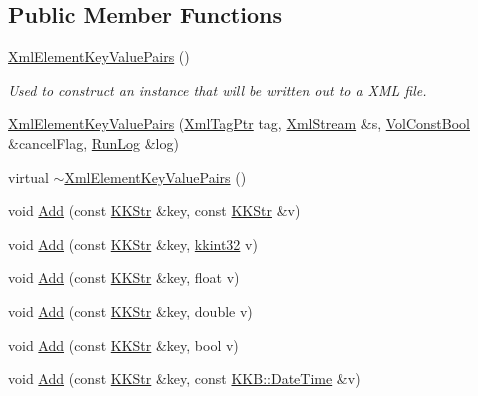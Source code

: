 \subsection*{Public Member Functions}
\begin{DoxyCompactItemize}
\item 
\hyperlink{class_k_k_b_1_1_xml_element_key_value_pairs_ad07cc9e4db6a0a62e69e9a08d21874fa}{Xml\+Element\+Key\+Value\+Pairs} ()
\begin{DoxyCompactList}\small\item\em Used to construct an instance that will be written out to a X\+ML file.\end{DoxyCompactList}\item 
\hyperlink{class_k_k_b_1_1_xml_element_key_value_pairs_a791817932e4f210de4c1f1d76926e4cb}{Xml\+Element\+Key\+Value\+Pairs} (\hyperlink{namespace_k_k_b_a9253a3ea8a5da18ca82be4ca2b390ef0}{Xml\+Tag\+Ptr} tag, \hyperlink{class_k_k_b_1_1_xml_stream}{Xml\+Stream} \&s, \hyperlink{namespace_k_k_b_a7d390f568e2831fb76b86b56c87bf92f}{Vol\+Const\+Bool} \&cancel\+Flag, \hyperlink{class_k_k_b_1_1_run_log}{Run\+Log} \&log)
\item 
virtual \hyperlink{class_k_k_b_1_1_xml_element_key_value_pairs_a9aef5c5df7adca778dc63279cbe9405d}{$\sim$\+Xml\+Element\+Key\+Value\+Pairs} ()
\item 
void \hyperlink{class_k_k_b_1_1_xml_element_key_value_pairs_a183f57a4bf399567339851b93fa127c9}{Add} (const \hyperlink{class_k_k_b_1_1_k_k_str}{K\+K\+Str} \&key, const \hyperlink{class_k_k_b_1_1_k_k_str}{K\+K\+Str} \&v)
\item 
void \hyperlink{class_k_k_b_1_1_xml_element_key_value_pairs_afa83abc034f5078ee2e0e7e0b0731c52}{Add} (const \hyperlink{class_k_k_b_1_1_k_k_str}{K\+K\+Str} \&key, \hyperlink{namespace_k_k_b_a8fa4952cc84fda1de4bec1fbdd8d5b1b}{kkint32} v)
\item 
void \hyperlink{class_k_k_b_1_1_xml_element_key_value_pairs_a880931e1f21ab680cd98edf0e04a258f}{Add} (const \hyperlink{class_k_k_b_1_1_k_k_str}{K\+K\+Str} \&key, float v)
\item 
void \hyperlink{class_k_k_b_1_1_xml_element_key_value_pairs_a153ac88a314b266433ba6fadeafcdb70}{Add} (const \hyperlink{class_k_k_b_1_1_k_k_str}{K\+K\+Str} \&key, double v)
\item 
void \hyperlink{class_k_k_b_1_1_xml_element_key_value_pairs_a9c97b5d58a5a42b59bcb16880eb5a87d}{Add} (const \hyperlink{class_k_k_b_1_1_k_k_str}{K\+K\+Str} \&key, bool v)
\item 
void \hyperlink{class_k_k_b_1_1_xml_element_key_value_pairs_a01c67f5286a403fd7d54fa5d693d9c64}{Add} (const \hyperlink{class_k_k_b_1_1_k_k_str}{K\+K\+Str} \&key, const \hyperlink{class_k_k_b_1_1_date_time}{K\+K\+B\+::\+Date\+Time} \&v)

\end{DoxyCompactItemize}
